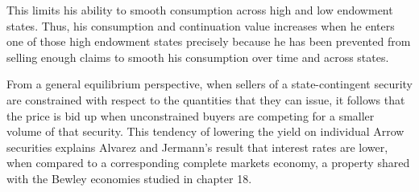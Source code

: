 This limits his ability to smooth consumption across high and low endowment
states.
Thus, his consumption and continuation
value increases when  he enters one of those high endowment states
precisely because he has been prevented from selling enough
claims to smooth his consumption over time and across states.


From a general equilibrium perspective, when sellers of a state-contingent security are constrained with respect to the quantities that they can issue, it follows that the price is bid up when unconstrained buyers are competing for a smaller volume of that security. This tendency of lowering the yield on individual Arrow securities explains Alvarez and Jermann's result that interest rates are lower, when compared to a corresponding complete markets economy, a property shared with the Bewley economies studied in chapter 18.



